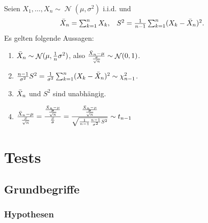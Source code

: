 \documentclass[a4paper,10pt]{article}
\DeclareMathOperator{\normal}{\mathcal{N}}
\numberwithin{equation}{section}
\begin{document}
\begin{subbox}{}
    Seien \( X_1, \dots, X_n \sim \normal(\mu, \sigma^2) \) i.i.d. und
    \[
        \begin{array}{cc}
            \Bar{X}_n = \sum_{k = 1}^n X_k, & S^2 = \frac{1}{n - 1} \sum_{k = 1}^n (X_k - \Bar{X}_n)^2 \text{.}
        \end{array}
    \]
    Es gelten folgende Aussagen:
    \begin{enumerate}
        \item \( \Bar{X}_n \sim \normal(\mu, \frac{1}{n} \sigma^2) \), also \( \frac{\Bar{X}_n - \mu}{\frac{\sigma}{\sqrt{n}}} \sim \normal(0, 1) \).
        \item \( \frac{n - 1}{\sigma^2} S^2 = \frac{1}{\sigma^2} \sum_{k = 1}^n (X_k - \Bar{X}_n)^2 \sim \chi^2_{n - 1} \).
        \item \( \Bar{X}_n \) und \( S^2 \) sind unabhängig.
        \item \( \frac{\Bar{X}_n - \mu}{\frac{S}{\sqrt{n}}} = \frac{\frac{\Bar{X}_n - \mu}{\frac{\sigma}{\sqrt{n}}}}{\frac{S}{\sigma}} = \frac{\frac{\Bar{X}_n - \mu}{\frac{\sigma}{\sqrt{n}}}}{\sqrt{\frac{1}{n - 1} \frac{n - 1}{\sigma^2} S^2}} \sim t_{n - 1} \)
    \end{enumerate}
\end{subbox}

\section{Tests}

\subsection{Grundbegriffe}


\subsubsection{Hypothesen}
\end{document}
